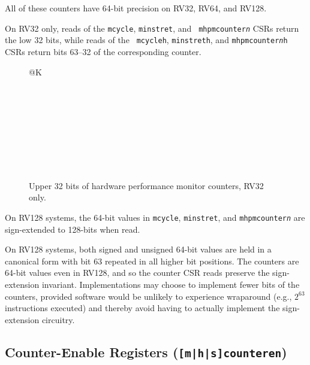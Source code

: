 All of these counters have 64-bit precision on RV32, RV64, and RV128.

On RV32 only, reads of the {\tt mcycle}, {\tt minstret}, and {\tt
mhpmcounter{\em n}} CSRs return the low 32 bits, while reads of the {\tt
mcycleh}, {\tt minstreth}, and {\tt mhpmcounter{\em n}h} CSRs return bits
63--32 of the corresponding counter.

\begin{figure}[h!]
{\footnotesize
\begin{center}
\begin{tabular}{@{}K}
 \\ \hline
{} \\ \hline
{} \\ \hline
{} \\ \hline
{} \\ \hline
{}  \\ \hline
{} \\ \hline
{} \\  \\
\end{tabular}
\end{center}
}
\vspace{-0.1in}
\caption{Upper 32 bits of hardware performance monitor counters, RV32 only.}
\end{figure}

On RV128 systems, the 64-bit values in {\tt mcycle}, {\tt minstret}, and
{\tt mhpmcounter{\em n}} are sign-extended to 128-bits when read.
\begin{commentary}
On RV128 systems, both signed and unsigned 64-bit values are held in a
canonical form with bit 63 repeated in all higher bit positions.  The
counters are 64-bit values even in RV128, and so the counter CSR reads
preserve the sign-extension invariant.  Implementations may choose to
implement fewer bits of the counters, provided software would be unlikely
to experience wraparound (e.g., $2^{63}$ instructions executed)
and thereby avoid having to actually implement the sign-extension
circuitry.
\end{commentary}

\subsection{Counter-Enable Registers ({\tt [m|h|s]counteren})}
\label{sec:mcounteren}

